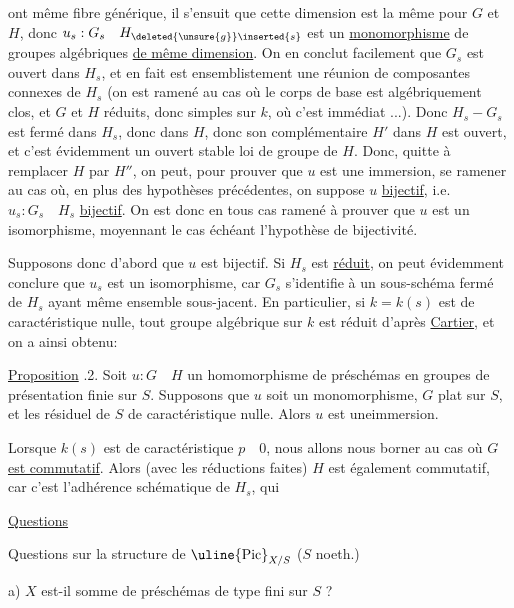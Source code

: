 ont même fibre générique, il s'ensuit que cette dimension est la même pour $G$ et $H$, donc $u_s:G_s\quad H_{\deleted{\unsure{g}}\inserted{s}}$ est un \uline{monomorphisme} de groupes algébriques \uline{de même dimension}. On en conclut facilement que $G_s$ est ouvert dans $H_s$, et en fait est ensemblistement une  réunion de composantes connexes de $H_s$ (on est ramené au cas où le corps de base est algébriquement clos, et $G$ et $H$ réduits, donc simples sur $k$, où c'est immédiat ...). Donc $H_s-G_s$ est fermé dans $H_s$, donc dans $H$, donc son complémentaire $H'$ dans $H$ est ouvert, et c'est évidemment un ouvert stable  loi de groupe de $H$. Donc,   quitte à remplacer $H$ par $H''$, on peut, pour prouver que $u$ est une immersion, se ramener au cas où, en plus des hypothèses précédentes, on suppose $u$ \uline{bijectif},  i.e. $u_s:G_s\quad H_s$ \uline{bijectif}. On est donc en tous cas ramené à prouver que $u$  est un isomorphisme, moyennant le cas échéant l'hypothèse de bijectivité.

Supposons donc d'abord que $u$ est bijectif. Si $H_s$ est \uline{réduit}, on peut évidemment conclure que $u_s$ est un isomorphisme, car $G_s$ s'identifie à un sous-schéma fermé de $H_s$ ayant même ensemble sous-jacent. En particulier, si $k=k(s)$ est de caractéristique nulle, tout groupe algébrique sur $k$ est réduit d'après \uline{Cartier}, et on  a ainsi obtenu:

\uline{Proposition} .2. Soit $u:G\quad H$ un homomorphisme de préschémas en groupes de présentation finie sur $S$. Supposons que $u$ soit un monomorphisme, $G$ plat sur $S$, et les  résiduel de $S$  de caractéristique nulle. Alors $u$ est uneimmersion.

Lorsque $k(s)$ est de caractéristique $p\quad0$, nous allons nous borner au cas où $G$ \uline{est commutatif}. Alors (avec les réductions faites) $H$ est également commutatif, car c'est l'adhérence schématique de $H_s$, qui

\uline{Questions }

Questions sur la structure de $\uline{\mathrm{Pic}}_{X/S}$ \quad ($S$ noeth.)

a) $X$ est-il somme  de préschémas de type fini sur $S$ ?

